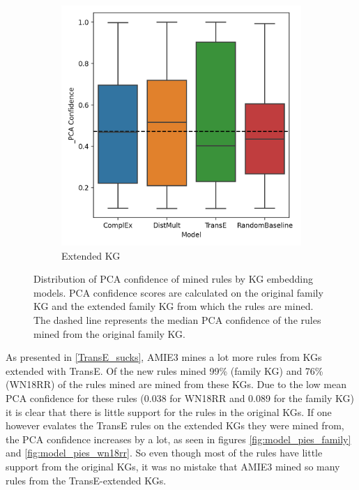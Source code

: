 \begin{figure}[h]
\begin{subfigure}{.5\textwidth}
  \includegraphics[width=1\linewidth]{figures/results/PCA_models/_PCA-models_family.png}
  \caption{Extended KG}
  \label{fig:_PCA_models_family_boxplot_sub}
\end{subfigure}
\caption{Distribution of PCA confidence of mined rules by KG embedding models. PCA confidence scores are calculated on the original family KG and the extended family KG from which the rules are mined. The dashed line represents the median PCA confidence of the rules mined from the original family KG.}
\label{fig:PCA_models_family_boxplot}
\end{figure}


As presented in \cref{TransE_sucks}, AMIE3 mines a lot more rules from KGs extended with TransE. Of the new rules mined 99\% (family KG) and 76\% (WN18RR) of the rules mined are mined from these KGs. Due to the low mean PCA confidence for these rules (0.038 for WN18RR and 0.089 for the family KG) it is clear that there is little support for the rules in the original KGs. If one however evalates the TransE rules on the extended KGs they were mined from, the PCA confidence increases by a lot, as seen in figures \ref{fig:model_pies_family} and \ref{fig:model_pies_wn18rr}. So even though most of the rules have little support from the original KGs, it was no mistake that AMIE3 mined so many rules from the TransE-extended KGs.

